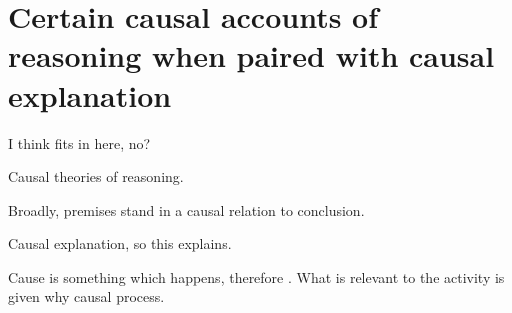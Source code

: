 \section{Certain causal accounts of reasoning when paired with causal explanation}
\label{cha:lit:causal}

\begin{note}
  \color{red}
  I think \citeauthor{Wedgwood:2006ui} fits in here, no?
\end{note}

\begin{note}
  Causal theories of reasoning.

  Broadly, premises stand in a causal relation to conclusion.

  Causal explanation, so this explains.

  Cause is something which happens, therefore \wit{}.
  What is relevant to the activity is given why causal process.
\end{note}

